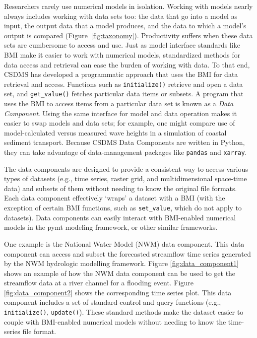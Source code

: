 \documentclass{article} %
\begin{document}
Researchers rarely use numerical models in isolation. Working with models nearly always includes working with data sets too: the data that go into a model as input, the output data that a model produces, and the data to which a model's output is compared (Figure~\ref{fig:taxonomy}). Productivity suffers when these data sets are cumbersome to access and use. Just as model interface standards like BMI make it easier to work with numerical models, standardized methods for data access and retrieval can ease the burden of working with data. To that end, CSDMS has developed a programmatic approach that uses the BMI for data retrieval and access. Functions such as \texttt{initialize()} retrieve and open a data set, and \texttt{get\_value()} fetches particular data items or subsets. A program that uses the BMI to access items from a particular data set is known as a \textit{Data Component}. Using the same interface for model and data operation makes it easier to swap models and data sets; for example, one might compare use of model-calculated versus measured wave heights in a simulation of coastal sediment transport. Because CSDMS Data Components are written in Python, they can take advantage of data-management packages like \texttt{pandas} and \texttt{xarray}.

The data components are designed to provide a consistent way to access various types of datasets (e.g., time series, raster grid, and multidimensional space-time data) and subsets of them without needing to know the original file formats. Each data component effectively `wraps' a dataset with a BMI (with the exception of certain BMI functions, such as \texttt{set\_value}, which do not apply to datasets). Data components can easily interact with BMI-enabled numerical models in the pymt modeling framework, or other similar frameworks.

One example is the National Water Model (NWM) data component. This data component can access and subset the forecasted streamflow time series generated by the NWM hydrologic modelling framework. Figure \ref{fig:data_component1} shows an example of how the NWM data component can be used to get the streamflow data at a river channel for a flooding event. Figure \ref{fig:data_component2} shows the corresponding time series plot. This data component includes a set of standard control and query functions (e.g.,  \texttt{initialize()}, \texttt{update()}). These standard methods make the dataset easier to couple with BMI-enabled numerical models  without needing to know the time-series file format.
\end{document}
